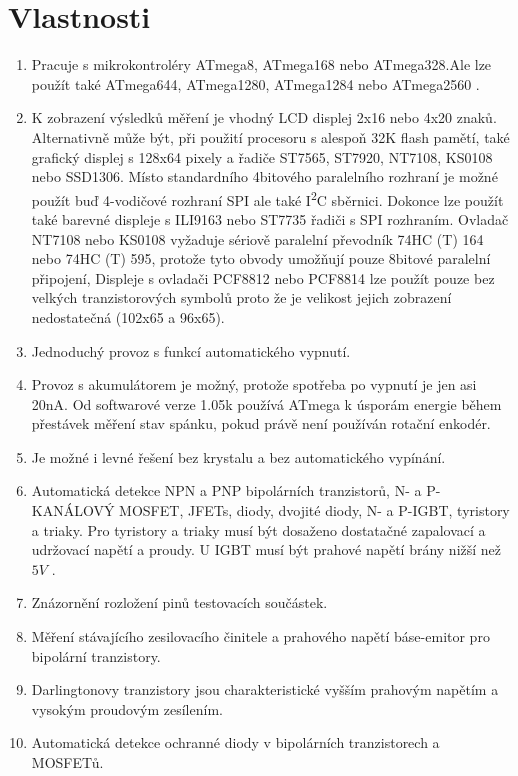 \chapter{Vlastnosti}
\label{sec:features}
\begin{enumerate} \setlength{\itemsep}{0pt}
\item Pracuje s mikrokontroléry ATmega8, ATmega168 nebo ATmega328.Ale lze použít také ATmega644, ATmega1280, ATmega1284 nebo ATmega2560 .
\item K zobrazení výsledků měření je vhodný LCD displej 2x16 nebo 4x20 znaků.
 Alternativně může být, při použití procesoru s alespoň 32K flash pamětí, také grafický displej
 s 128x64 pixely a řadiče ST7565, ST7920, NT7108, KS0108 nebo SSD1306.
 Místo standardního 4bitového paralelního rozhraní je možné použít buď 4-vodičové rozhraní SPI ale také I\textsuperscript{2}C sběrnici.
 Dokonce lze použít také barevné displeje s ILI9163 nebo ST7735 řadiči s SPI rozhraním.
 Ovladač NT7108 nebo KS0108 vyžaduje sériově paralelní převodník 74HC (T) 164 nebo 74HC (T) 595,
 protože tyto obvody umožňují pouze 8bitové paralelní připojení,
 Displeje s ovladači PCF8812 nebo PCF8814 lze použít pouze bez velkých tranzistorových symbolů
 proto že je velikost jejich zobrazení nedostatečná (102x65 a 96x65).
\item Jednoduchý provoz s funkcí automatického vypnutí.
\item Provoz s akumulátorem je možný, protože spotřeba po vypnutí je jen asi 20nA.
Od softwarové verze 1.05k používá ATmega k úsporám energie během přestávek měření stav spánku, pokud právě není používán rotační enkodér.
\item Je možné i levné řešení bez krystalu a bez automatického vypínání.
\item Automatická detekce NPN a PNP bipolárních tranzistorů, N- a P-KANÁLOVÝ MOSFET, JFETs, diody, dvojité diody, N- a P-IGBT, tyristory a triaky.
Pro tyristory a triaky musí být dosaženo dostatačné zapalovací a udržovací napětí a proudy.
U IGBT musí být prahové napětí brány nižší než  \(5V\) .
\item Znázornění rozložení pinů testovacích součástek.
\item Měření stávajícího zesilovacího činitele a prahového napětí báse-emitor pro bipolární tranzistory.
\item Darlingtonovy tranzistory jsou charakteristické vyšším prahovým napětím a vysokým proudovým zesílením.
\item Automatická detekce ochranné diody v bipolárních tranzistorech a MOSFETů.

\end{enumerate}
